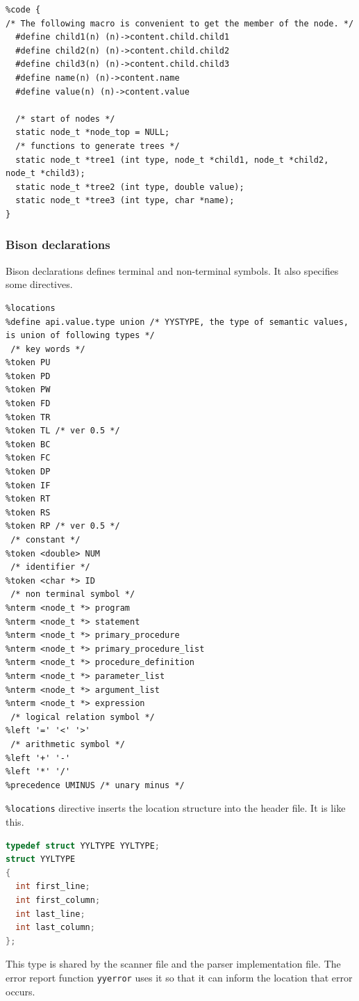 \begin{lstlisting}
%code {
/* The following macro is convenient to get the member of the node. */
  #define child1(n) (n)->content.child.child1
  #define child2(n) (n)->content.child.child2
  #define child3(n) (n)->content.child.child3
  #define name(n) (n)->content.name
  #define value(n) (n)->content.value

  /* start of nodes */
  static node_t *node_top = NULL;
  /* functions to generate trees */
  static node_t *tree1 (int type, node_t *child1, node_t *child2, node_t *child3);
  static node_t *tree2 (int type, double value);
  static node_t *tree3 (int type, char *name);
}
\end{lstlisting}

\subsubsection{Bison declarations}\label{bison-declarations}

Bison declarations defines terminal and non-terminal symbols. It also
specifies some directives.

\begin{lstlisting}
%locations
%define api.value.type union /* YYSTYPE, the type of semantic values, is union of following types */
 /* key words */
%token PU
%token PD
%token PW
%token FD
%token TR
%token TL /* ver 0.5 */
%token BC
%token FC
%token DP
%token IF
%token RT
%token RS
%token RP /* ver 0.5 */
 /* constant */
%token <double> NUM
 /* identifier */
%token <char *> ID
 /* non terminal symbol */
%nterm <node_t *> program
%nterm <node_t *> statement
%nterm <node_t *> primary_procedure
%nterm <node_t *> primary_procedure_list
%nterm <node_t *> procedure_definition
%nterm <node_t *> parameter_list
%nterm <node_t *> argument_list
%nterm <node_t *> expression
 /* logical relation symbol */
%left '=' '<' '>'
 /* arithmetic symbol */
%left '+' '-'
%left '*' '/'
%precedence UMINUS /* unary minus */
\end{lstlisting}

\passthrough{\lstinline!\%locations!} directive inserts the location
structure into the header file. It is like this.

\begin{lstlisting}[language=C]
typedef struct YYLTYPE YYLTYPE;
struct YYLTYPE
{
  int first_line;
  int first_column;
  int last_line;
  int last_column;
};
\end{lstlisting}

This type is shared by the scanner file and the parser implementation
file. The error report function \passthrough{\lstinline!yyerror!} uses
it so that it can inform the location that error occurs.

